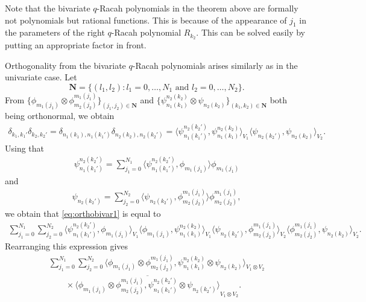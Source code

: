 \documentclass[10pt,a4paper]{amsart}
\numberwithin{equation}{section}
\begin{document}
\begin{Remark}
	Note that the bivariate $q$-Racah polynomials in the theorem above are formally not polynomials but rational functions. This is because of the appearance of $j_1$ in the parameters of the right $q$-Racah polynomial $R_{k_2}$. This can be solved easily by putting an appropriate factor in front.
\end{Remark}
\begin{Remark}
	Orthogonality from the bivariate $q$-Racah polynomials arises similarly as in the univariate case. Let
	\[
	\mathbf{N}=\{(l_1,l_2)\colon l_1=0,\dots ,N_1\text{ and }l_2=0,\dots,N_2\}.
	\]
	From $\big\{\phi_{m_1(j_1)}\otimes \phi_{m_2(j_2)}^{m_1(j_1)}\big\}_{(j_1,j_2)\in\mathbf{N}}$ and $\big\{\psi_{n_1(k_1)}^{n_2(k_2)}\otimes \psi_{n_2(k_2)}\big\}_{(k_1,k_2)\in\mathbf{N}}$ both being orthonormal, we obtain
	\begin{gather}
		\delta_{k_1,k_1'}\delta_{k_2,k_2'} =\delta_{n_1(k_1),n_1(k_1')}\delta_{n_2(k_2),n_2(k_2')}= \big\langle \psi_{n_1(k_1')}^{n_2(k_2')},\psi_{n_1(k_1)}^{n_2(k_2)}\big\rangle _{V_1}\big\langle \psi_{n_2(k_2')},\psi_{n_2(k_2)}\big\rangle _{V_2}.\label{eq:orthobivar1}
	\end{gather}
	Using that
	\begin{gather*}
		\psi_{n_1(k_1')}^{n_2(k_2')}=\sum_{j_1=0}^{N_1}\big\langle \psi_{n_1(k_1')}^{n_2(k_2')},\phi_{m_1(j_1)}\big\rangle \phi_{m_1(j_1)}
	\end{gather*}
	and
	\begin{gather*}
		\psi_{n_2(k_2')}=\sum_{j_2=0}^{N_2}\big\langle \psi_{n_2(k_2')},\phi_{m_2(j_2)}^{m_1(j_1)}\big\rangle \phi_{m_2(j_2)}^{m_1(j_1)},
	\end{gather*}
	we obtain that \eqref{eq:orthobivar1} is equal to		
	\begin{gather*}
 \sum_{j_1=0}^{N_1}\sum_{j_2=0}^{N_2} \big\langle \psi_{n_1(k_1')}^{n_2(k_2')},\phi_{m_1(j_1)}\big\rangle _{V_1}\big\langle \phi_{m_1(j_1)},\psi_{n_1(k_1)}^{n_2(k_2)}\big\rangle _{V_1}\big\langle \psi_{n_2(k_2')}, \phi_{m_2(j_2)}^{m_1(j_1)}\big\rangle _{V_2}\big\langle \phi_{m_2(j_2)}^{m_1(j_1)},\psi_{n_2(k_2)}\big\rangle _{V_2}.
\end{gather*}
Rearranging this expression gives
\begin{gather*}
\sum_{j_1=0}^{N_1}\sum_{j_2=0}^{N_2} \big\langle \phi_{m_1(j_1)}\otimes \phi_{m_2(j_2)}^{m_1(j_1)},\psi_{n_1(k_1)}^{n_2(k_2)}\otimes \psi_{n_2(k_2)}\big\rangle _{V_1\otimes V_2}\\
\qquad{} \times \overline{\big\langle \phi_{m_1(j_1)}\otimes \phi_{m_2(j_2)}^{m_1(j_1)},\psi_{n_1(k_1')}^{n_2(k_2')}\otimes \psi_{n_2(k_2')}\big\rangle }_{V_1\otimes V_2}.

\end{gather*}
\end{Remark}
\end{document}
